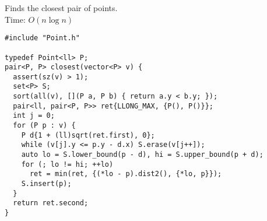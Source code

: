 Finds the closest pair of points.\\
Time: $O(n \log n)$
\begin{verbatim}
#include "Point.h"

typedef Point<ll> P;
pair<P, P> closest(vector<P> v) {
  assert(sz(v) > 1);
  set<P> S;
  sort(all(v), [](P a, P b) { return a.y < b.y; });
  pair<ll, pair<P, P>> ret{LLONG_MAX, {P(), P()}};
  int j = 0;
  for (P p : v) {
    P d{1 + (ll)sqrt(ret.first), 0};
    while (v[j].y <= p.y - d.x) S.erase(v[j++]);
    auto lo = S.lower_bound(p - d), hi = S.upper_bound(p + d);
    for (; lo != hi; ++lo)
      ret = min(ret, {(*lo - p).dist2(), {*lo, p}});
    S.insert(p);
  }
  return ret.second;
}
\end{verbatim}
